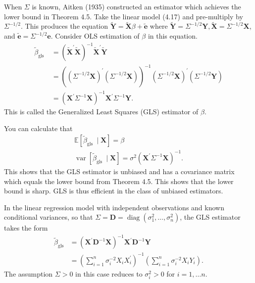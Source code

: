 \documentclass[10pt]{article}
\begin{document}
When $\Sigma$ is known, Aitken (1935) constructed an estimator which achieves the lower bound in Theorem 4.5. Take the linear model (4.17) and pre-multiply by $\Sigma^{-1 / 2}$. This produces the equation $\tilde{\boldsymbol{Y}}=\widetilde{\boldsymbol{X}} \beta+\widetilde{\boldsymbol{e}}$ where $\tilde{\boldsymbol{Y}}=\Sigma^{-1 / 2} \boldsymbol{Y}, \widetilde{\boldsymbol{X}}=\Sigma^{-1 / 2} \boldsymbol{X}$, and $\widetilde{\boldsymbol{e}}=\Sigma^{-1 / 2} \boldsymbol{e}$. Consider OLS estimation of $\beta$ in this equation.
$$
\begin{aligned}
\widetilde{\beta}_{\text {gls }} &=\left(\widetilde{\boldsymbol{X}}^{\prime} \widetilde{\boldsymbol{X}}\right)^{-1} \widetilde{\boldsymbol{X}}^{\prime} \widetilde{\boldsymbol{Y}} \\
&=\left(\left(\Sigma^{-1 / 2} \boldsymbol{X}\right)^{\prime}\left(\Sigma^{-1 / 2} \boldsymbol{X}\right)\right)^{-1}\left(\Sigma^{-1 / 2} \boldsymbol{X}\right)^{\prime}\left(\Sigma^{-1 / 2} \boldsymbol{Y}\right) \\
&=\left(\boldsymbol{X}^{\prime} \Sigma^{-1} \boldsymbol{X}\right)^{-1} \boldsymbol{X}^{\prime} \Sigma^{-1} \boldsymbol{Y} .
\end{aligned}
$$
This is called the Generalized Least Squares (GLS) estimator of $\beta$.

You can calculate that
$$
\begin{gathered}
\mathbb{E}\left[\widetilde{\beta}_{\text {gls }} \mid \boldsymbol{X}\right]=\beta \\
\operatorname{var}\left[\widetilde{\beta}_{\text {gls }} \mid \boldsymbol{X}\right]=\sigma^{2}\left(\boldsymbol{X}^{\prime} \Sigma^{-1} \boldsymbol{X}\right)^{-1} .
\end{gathered}
$$
This shows that the GLS estimator is unbiased and has a covariance matrix which equals the lower bound from Theorem 4.5. This shows that the lower bound is sharp. GLS is thus efficient in the class of unbiased estimators.

In the linear regression model with independent observations and known conditional variances, so that $\Sigma=\boldsymbol{D}=\operatorname{diag}\left(\sigma_{1}^{2}, \ldots, \sigma_{n}^{2}\right)$, the GLS estimator takes the form
$$
\begin{aligned}
\widetilde{\beta}_{\mathrm{gls}} &=\left(\boldsymbol{X}^{\prime} \boldsymbol{D}^{-1} \boldsymbol{X}\right)^{-1} \boldsymbol{X}^{\prime} \boldsymbol{D}^{-1} \boldsymbol{Y} \\
&=\left(\sum_{i=1}^{n} \sigma_{i}^{-2} X_{i} X_{i}^{\prime}\right)^{-1}\left(\sum_{i=1}^{n} \sigma_{i}^{-2} X_{i} Y_{i}\right) .
\end{aligned}
$$
The assumption $\Sigma>0$ in this case reduces to $\sigma_{i}^{2}>0$ for $i=1, \ldots n$.
\end{document}
